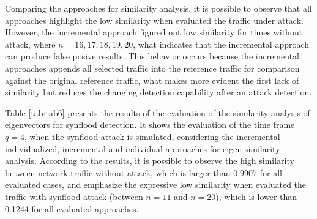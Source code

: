 \documentclass[review]{elsarticle}
\begin{document}
Comparing the approaches for similarity analysis, it is possible to observe that all approaches highlight the low similarity when evaluated the traffic under attack. However, the incremental approach figured out low similarity for times without attack, where $n=16, 17, 18, 19, 20$, what indicates that the incremental approach can produce false posive results. This behavior occurs because the incremental approaches appends all selected traffic into the reference traffic for comparison against the original reference traffic, what makes more evident the first lack of similarity but reduces the changing detection capability after an attack detection.

Table \ref{tab:tab6} presents the results of the evaluation of the similarity analysis of eigenvectors for synflood detection. It shows the evaluation of the time frame $q=4$, when the synflood attack is simulated, considering the incremental individualized, incremental and individual approaches for eigen similarity analysis. According to the results, it is possible to observe the high similarity between network traffic without attack, which is larger than 0.9907 for all evaluated cases, and emphasize the expressive low similarity when evaluated the traffic with synflood attack (between $n=11$ and $n=20$), which is lower than 0.1244 for all evaluated approaches.
\end{document}
